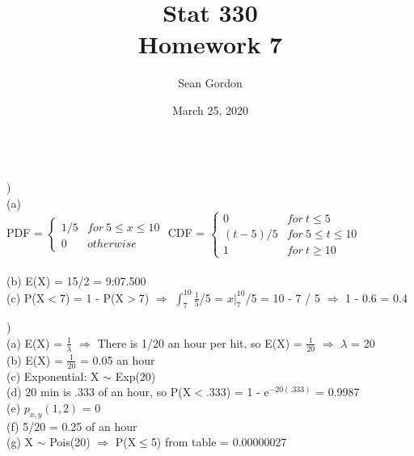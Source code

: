 \documentclass[12pt]{article}
\title{Stat 330\\Homework 7}
\author{Sean Gordon}
\date{March 25, 2020}
\begin{document}
\maketitle


\noindent\hrulefill \\[-.8em]


)\\
\indent (a) \\
\indent \indent PDF =
$
\begin{cases} 
	1/5 & for\ 5 \leq x \leq 10 \\
	0 & otherwise 
\end{cases}
$
\indent \indent CDF = 
$
\begin{cases} 
	0 & for\ t \leq 5\\
	(t - 5)/5 & for\ 5 \leq t \leq 10 \\
	1 & for\ t \ge 10 
\end{cases}
$\\\\

\indent (b) 
E(X) = 15/2 = 9:07.500\\


\indent (c) P(X$<$7) = 1 - P(X$>$7) $\Rightarrow$ {\Large$\int_{7}^{10}\frac{1}{5}$}/5 = $x\Big|_7^{10}$/5 = 10 - 7 / 5 $\Rightarrow$ 1 - 0.6 = 0.4\\


\noindent \hrulefill 


)\\
\indent (a) E(X) = {\Large$\frac{1}{\lambda}$} $\Rightarrow$ There is 1/20 an hour per hit, so E(X) = {\Large$\frac{1}{20}$} $\Rightarrow$ $\lambda$ = 20\\

\indent (b) E(X) = {\Large$\frac{1}{20}$} = 0.05 an hour\\

\indent (c) Exponential: X $\sim$ Exp(20)\\

\indent (d) 20 min is .333 of an hour, so P(X$<$.333) = 1 - e$^{-20(.333)}$ = 0.9987\\

\indent (e) $p_{x, y}(1, 2)$ = 0\\

\indent (f) 5/20 = 0.25 of an hour\\

\indent (g) X $\sim$ Pois(20) $\Rightarrow$ P(X$\leq$5) from table = 0.00000027\\
\end{document}
